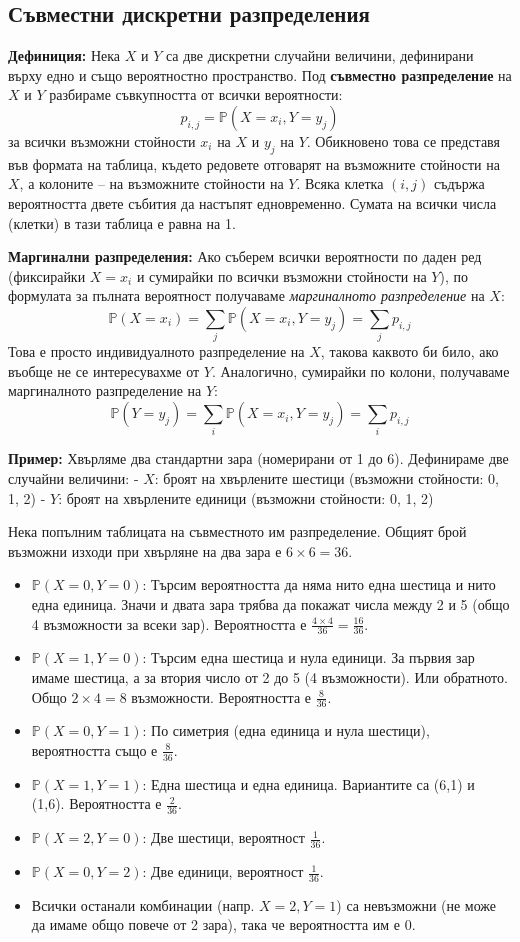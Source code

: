 \documentclass{article}
\begin{document}
\subsection{Съвместни дискретни разпределения}

\textbf{Дефиниция:} Нека $X$ и $Y$ са две дискретни случайни величини, дефинирани върху едно и също вероятностно пространство. Под \textbf{съвместно разпределение} на $X$ и $Y$ разбираме съвкупността от всички вероятности:
\[
p_{i,j} = \mathbb{P}(X = x_i, Y = y_j)
\]
за всички възможни стойности $x_i$ на $X$ и $y_j$ на $Y$. Обикновено това се представя във формата на таблица, където редовете отговарят на възможните стойности на $X$, а колоните – на възможните стойности на $Y$. Всяка клетка $(i, j)$ съдържа вероятността двете събития да настъпят едновременно. Сумата на всички числа (клетки) в тази таблица е равна на 1.

\textbf{Маргинални разпределения:} 
Ако съберем всички вероятности по даден ред (фиксирайки $X = x_i$ и сумирайки по всички възможни стойности на $Y$), по формулата за пълната вероятност получаваме \textit{маргиналното разпределение} на $X$:
\[
\mathbb{P}(X = x_i) = \sum_{j} \mathbb{P}(X = x_i, Y = y_j) = \sum_{j} p_{i,j}
\]
Това е просто индивидуалното разпределение на $X$, такова каквото би било, ако въобще не се интересувахме от $Y$. Аналогично, сумирайки по колони, получаваме маргиналното разпределение на $Y$:
\[
\mathbb{P}(Y = y_j) = \sum_{i} \mathbb{P}(X = x_i, Y = y_j) = \sum_{i} p_{i,j}
\]

\textbf{Пример:} Хвърляме два стандартни зара (номерирани от 1 до 6). Дефинираме две случайни величини:
- $X$: броят на хвърлените шестици (възможни стойности: 0, 1, 2)
- $Y$: броят на хвърлените единици (възможни стойности: 0, 1, 2)

Нека попълним таблицата на съвместното им разпределение. Общият брой възможни изходи при хвърляне на два зара е $6 \times 6 = 36$.
\begin{itemize}
    \item $\mathbb{P}(X=0, Y=0)$: Търсим вероятността да няма нито една шестица и нито една единица. Значи и двата зара трябва да покажат числа между 2 и 5 (общо 4 възможности за всеки зар). Вероятността е $\frac{4 \times 4}{36} = \frac{16}{36}$.
    \item $\mathbb{P}(X=1, Y=0)$: Търсим една шестица и нула единици. За първия зар имаме шестица, а за втория число от 2 до 5 (4 възможности). Или обратното. Общо $2 \times 4 = 8$ възможности. Вероятността е $\frac{8}{36}$.
    \item $\mathbb{P}(X=0, Y=1)$: По симетрия (една единица и нула шестици), вероятността също е $\frac{8}{36}$.
    \item $\mathbb{P}(X=1, Y=1)$: Една шестица и една единица. Вариантите са (6,1) и (1,6). Вероятността е $\frac{2}{36}$.
    \item $\mathbb{P}(X=2, Y=0)$: Две шестици, вероятност $\frac{1}{36}$.
    \item $\mathbb{P}(X=0, Y=2)$: Две единици, вероятност $\frac{1}{36}$.
    \item Всички останали комбинации (напр. $X=2, Y=1$) са невъзможни (не може да имаме общо повече от 2 зара), така че вероятността им е 0.
\end{itemize}
\end{document}
